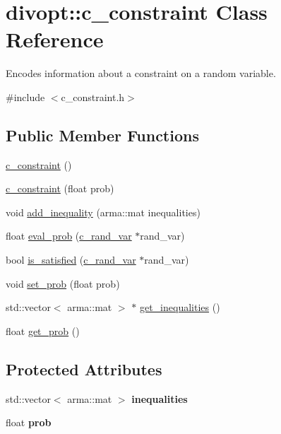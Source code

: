 \hypertarget{classdivopt_1_1c__constraint}{\section{divopt\-:\-:c\-\_\-constraint \-Class \-Reference}
\label{classdivopt_1_1c__constraint}
}


\-Encodes information about a constraint on a random variable.  




{\ttfamily \#include $<$c\-\_\-constraint.\-h$>$}

\subsection*{\-Public \-Member \-Functions}
\begin{DoxyCompactItemize}
\item 
\hyperlink{classdivopt_1_1c__constraint_af7708cbcea2a4c3a9c75f9cae4aa86c9}{c\-\_\-constraint} ()
\item 
\hyperlink{classdivopt_1_1c__constraint_a51f6d7e631c0fc45fa07954fa3f03b6e}{c\-\_\-constraint} (float prob)
\item 
void \hyperlink{classdivopt_1_1c__constraint_aa82b65fdba6b91d1f20821012370264c}{add\-\_\-inequality} (arma\-::mat inequalities)
\item 
float \hyperlink{classdivopt_1_1c__constraint_a615ea0956d9c28712f8eeeaecb29e0d9}{eval\-\_\-prob} (\hyperlink{classdivopt_1_1c__rand__var}{c\-\_\-rand\-\_\-var} $\ast$rand\-\_\-var)
\item 
bool \hyperlink{classdivopt_1_1c__constraint_ae07db5dcb26bdedc94768c62b7c403d8}{is\-\_\-satisfied} (\hyperlink{classdivopt_1_1c__rand__var}{c\-\_\-rand\-\_\-var} $\ast$rand\-\_\-var)
\item 
void \hyperlink{classdivopt_1_1c__constraint_a4eab366ff54ab0397a5a50cf70a312f4}{set\-\_\-prob} (float prob)
\item 
std\-::vector$<$ arma\-::mat $>$ $\ast$ \hyperlink{classdivopt_1_1c__constraint_aa2771a6e52ff89fd0fff62d080d29d1a}{get\-\_\-inequalities} ()
\item 
float \hyperlink{classdivopt_1_1c__constraint_a8d49fcb40dfdd2f99c90b36840a77d16}{get\-\_\-prob} ()
\end{DoxyCompactItemize}
\subsection*{\-Protected \-Attributes}
\begin{DoxyCompactItemize}
\item 
\hypertarget{classdivopt_1_1c__constraint_acfc1d794380a92f4384c113ba5e48685}{std\-::vector$<$ arma\-::mat $>$ {\bfseries inequalities}}\label{classdivopt_1_1c__constraint_acfc1d794380a92f4384c113ba5e48685}

\item 
\hypertarget{classdivopt_1_1c__constraint_a7cb45c815580f9f58a02ad58c9497fa0}{float {\bfseries prob}}\label{classdivopt_1_1c__constraint_a7cb45c815580f9f58a02ad58c9497fa0}

\end{DoxyCompactItemize}


